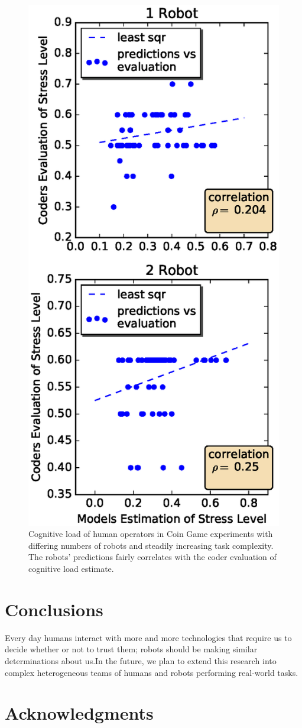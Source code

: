 \documentclass{sig-alternate}
\begin{document}
\begin{figure}
\centering
\includegraphics[width=.5\textwidth]{coder_eval_1_2.eps}
\caption{Cognitive load of human operators in Coin Game experiments with differing numbers of robots and steadily increasing task complexity. The robots' predictions fairly correlates with the coder evaluation of cognitive load estimate.}
\label{fig:coder_eval_1_2}
\end{figure}


\section{Conclusions}

Every day humans interact with more and more technologies that require us to decide whether or not to trust them; robots
should be making similar determinations about us.In the future, we plan to extend this research into complex
heterogeneous teams of humans and robots performing real-world tasks.

\section{Acknowledgments}



%

\end{document}
